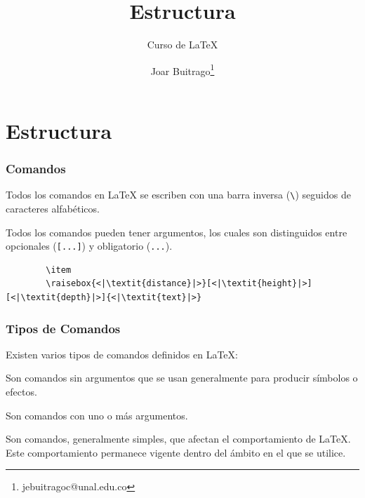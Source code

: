 \documentclass[12pt,aspectratio=169,ignorenonframetext]{ltxbeamer}
\title{Estructura}
\subtitle{Curso de {\lmr\LaTeX}}
\author{Joar Buitrago\texorpdfstring{\thanks{jebuitragoc@unal.edu.co}}{ <jebuitragoc@unal.edu.co>}}
\date{}
\begin{document}
\begin{frame}
\maketitle
\end{frame}

\section{Estructura}

\begin{frame}[fragile]
\frametitle{Comandos}

Todos los comandos en {\lmr\LaTeX} se escriben con una barra inversa (\texttt{\textbackslash}) seguidos de caracteres alfabéticos.

\pause

Todos los comandos pueden tener argumentos, los cuales son distinguidos entre opcionales (\texttt{[...]}) y obligatorio (\texttt{{...}}).

\pause

\begin{exampleblock}{}
    \begin{verbatim}
        \item
        \raisebox{<|\textit{distance}|>}[<|\textit{height}|>][<|\textit{depth}|>]{<|\textit{text}|>}
    \end{verbatim}
\end{exampleblock}
\end{frame}





\begin{frame}[fragile]
\frametitle{Tipos de Comandos}

Existen varios tipos de comandos definidos en {\lmr\LaTeX}:

\pause

\begin{description}[<+->]
    \item[Simples] Son comandos sin argumentos que se usan generalmente para producir símbolos o efectos.
    \item[Básicos] Son comandos con uno o más argumentos.
    \item[Globales] Son comandos, generalmente simples, que afectan el comportamiento de {\lmr\LaTeX}. Este comportamiento permanece vigente dentro del ámbito en el que se utilice.
\end{description}
\end{frame}
\end{document}
